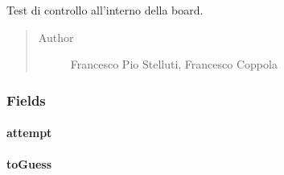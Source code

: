 \documentclass[letterpaper,10pt,italian,openany,oneside]{sphinxmanual}
\begin{document}
\begin{fulllineitems}
\label{\detokenize{test/it/unicam/cs/pa/mastermind/test/GameCoreBoardModelTest:it.unicam.cs.pa.mastermind.test.GameCoreBoardModelTest}}
Test di controllo all’interno della board.
\begin{quote}\begin{description}
\item[{Author}] \leavevmode
Francesco Pio Stelluti, Francesco Coppola

\end{description}\end{quote}

\end{fulllineitems}



\subsubsection{Fields}
\label{\detokenize{test/it/unicam/cs/pa/mastermind/test/GameCoreBoardModelTest:fields}}

\paragraph{attempt}
\label{\detokenize{test/it/unicam/cs/pa/mastermind/test/GameCoreBoardModelTest:attempt}}

\begin{fulllineitems}
\label{\detokenize{test/it/unicam/cs/pa/mastermind/test/GameCoreBoardModelTest:it.unicam.cs.pa.mastermind.test.GameCoreBoardModelTest.attempt}}
\end{fulllineitems}



\paragraph{toGuess}
\label{\detokenize{test/it/unicam/cs/pa/mastermind/test/GameCoreBoardModelTest:toguess}}
\end{document}
